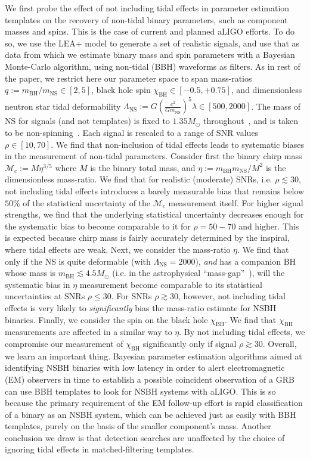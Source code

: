 \documentclass[aps,prd,amsmath,floats,floatfix, twocolumn,
superscriptaddress,nofootinbib,showpacs]{revtex4-1}
\newcommand{\lambdans}{\Lambda_\mathrm{NS}}
\newcommand{\chibh}{\chi_\mathrm{BH}}
\newcommand{\mbh}{m_\mathrm{BH}}
\newcommand{\mns}{m_\mathrm{NS}}
\newcommand{\mchirp}{\mathcal{M}_c}
\begin{document}
We first probe the effect of not including tidal effects in parameter 
estimation templates on the recovery of non-tidal binary parameters, such as 
component masses and spins. This is the case of current and planned aLIGO
efforts.
To do so, we use the LEA+ model to generate a set of realistic signals, and
use that as data from which we estimate binary mass and spin parameters with
a Bayesian Monte-Carlo algorithm, using non-tidal (BBH) waveforms as filters.
% 
As in rest of the paper, we restrict here our parameter space to span 
mass-ratios $q:=\mbh/\mns\in[2,5]$, black hole spin $\chibh\in[-0.5, +0.75]$, 
and dimensionless neutron star tidal deformability 
$\lambdans:= G\left(\frac{c^2}{G \mns}\right)^5\lambda \in[500, 2000]$.
The mass of NS for signals (and not templates) is fixed to $1.35M_\odot$ 
throughout~\cite{stellarcollapsemass}, and is taken to be 
non-spinning~\cite{Miller:2014aaa}.
Each signal is rescaled to a range of SNR values $\rho\in[10, 70]$.
% 
We find that non-inclusion of tidal effects leads to systematic biases in
the measurement of non-tidal parameters. Consider first the binary chirp 
mass $\mchirp:=M\eta^{3/5}$ where $M$ is the binary total mass, and 
$\eta:=\mbh\mns/M^2$ is the dimensionless mass-ratio. We find that for
realistic (moderate) SNRs, i.e. $\rho\lesssim 30$, not including tidal
effects introduces a barely measurable bias that remains below $50\%$
of the statistical uncertainty of the $\mchirp$ measurement itself.
For higher signal strengths, we find that the underlying statistical
uncertainty decreases enough for the systematic bias to become comparable
to it for $\rho=50-70$ and higher. This is expected because chirp mass is fairly
accurately determined by the inspiral, where tidal effects are weak.
Next, we consider the mass-ratio $\eta$. We find that only if the NS is quite
deformable (with $\lambdans=2000$), {\it and} has a companion BH whose mass
is $\mbh\lesssim 4.5M_\odot$ (i.e. in the astrophysical ``mass-gap''~\cite{
Bailyn:1997xt,Kalogera:1996ci,Kreidberg:2012,Littenberg:2015tpa}),
will the systematic bias in $\eta$ measurement become comparable to its
statistical uncertainties at SNRs $\rho\leq 30$. For SNRs $\rho\gtrsim30$,
however, not including tidal effects is very likely to {\it significantly} bias
the mass-ratio estimate for NSBH binaries. Finally, we consider the spin on the
black hole $\chibh$. We find that $\chibh$ measurements are affected in a similar
way to $\eta$. By not including tidal effects, we compromise our measurement of
$\chibh$ significantly only if signal $\rho\gtrsim 30$. 
%
Overall, we learn an important thing. Bayesian parameter estimation algorithms
aimed at identifying NSBH binaries with low latency in order to alert 
electromagnetic (EM) observers in time to establish a possible coincident 
observation of a GRB~\cite{2012A&A...541A.155A,Singer:2014qca,Singer:2015ema,
Pankow:2015cra} can use BBH templates to look for NSBH systems with aLIGO.
This is so because the primary requirement of the EM follow-up effort is rapid
classification of a binary as an NSBH system, which can be achieved just as 
easily with BBH templates, purely on the basis of the smaller component's mass.
Another conclusion we draw is that detection searches are unaffected by the
choice of ignoring tidal effects in matched-filtering templates.
\end{document}
